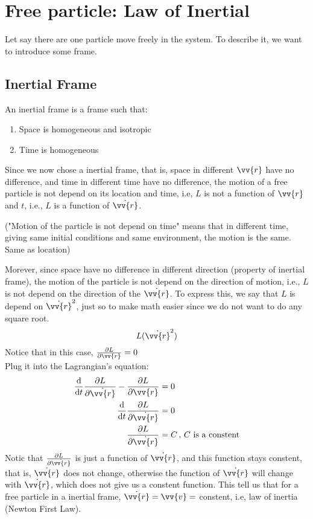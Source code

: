 \documentclass{article}
\newcommand{\de}{\mathrm{d}}
\begin{document}
\section{Free particle: Law of Inertial}

Let say there are one particle move freely in the system. To describe it, we want to introduce some frame.
\subsection{Inertial Frame}
An inertial frame is a frame such that:
\begin{enumerate}
    \item Space is homogeneous and isotropic
    \item Time is homogeneous
\end{enumerate}

Since we now chose a inertial frame, that is, space in different $\vv{r}$ have no difference, and time in different time have no difference, the motion of a free particle is not depend on its location and time, i.e, $L$ is not a function of $\vv{r}$ and $t$, i.e., $L$ is a function of $\dot{\vv{r}}$. 

("Motion of the particle is not depend on time" means that in different time, giving same initial conditions and same environment, the motion is the same. Same as location)

Morever, since space have no difference in different direction (property of inertial frame), the motion of the particle is not depend on the direction of motion, i.e., $L$ is not depend on the direction of the $\dot{\vv{r}}$. To express this, we say that $L$ is depend on $\dot{\vv{r}}^2$, just so to make math easier since we do not want to do any square root.
\[
L(\dot{\vv{r}}^2)
\]
Notice that in this case, $\frac{\partial L}{\partial \vv{r}} = 0$\\


Plug it into the Lagrangian's equation:
\begin{align*}
    \frac{\de}{\de t} \frac{\partial L}{\partial \dot{\vv{r}}} - \frac{\partial L}{\partial \vv{r}} &= 0 \\
    \frac{\de}{\de t} \frac{\partial L}{\partial \dot{\vv{r}}} &= 0 \\
    \frac{\partial L}{\partial \dot{\vv{r}}} &= C \, , \, C\text{ is a constent}
\end{align*}
Notic that $\frac{\partial L}{\partial \dot{\vv{r}}}$ is just a function of $\dot{\vv{r}}$, and this function stays constent, that is, $\dot{\vv{r}}$ does not change, otherwise the function of $\dot{\vv{r}}$ will change with $\dot{\vv{r}}$, which does not give us a constent function. This tell us that for a free particle in a inertial frame, $\dot{\vv{r}} = \vv{v} = $ constent, i.e, law of inertia (Newton First Law).
\end{document}
